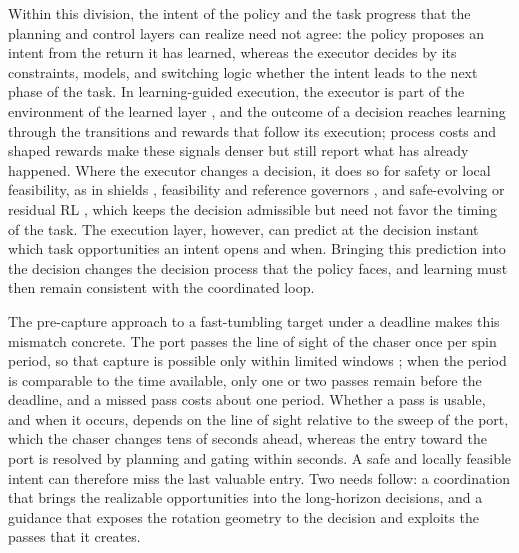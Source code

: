 Within this division, the intent of the policy and the task progress that the planning and control layers can realize need not agree: the policy proposes an intent from the return it has learned, whereas the executor decides by its constraints, models, and switching logic whether the intent leads to the next phase of the task. In learning-guided execution, the executor is part of the environment of the learned layer \cite{reiter2026arc}, and the outcome of a decision reaches learning through the transitions and rewards that follow its execution; process costs and shaped rewards \cite{ng1999shaping} make these signals denser but still report what has already happened. Where the executor changes a decision, it does so for safety or local feasibility, as in shields \cite{alshiekh2018shielding}, feasibility and reference governors \cite{leung2024scl,tartaglione2024aut,duan2025autcon}, and safe-evolving or residual RL \cite{lu2025eaai,zeng2026neucom}, which keeps the decision admissible but need not favor the timing of the task. The execution layer, however, can predict at the decision instant which task opportunities an intent opens and when. Bringing this prediction into the decision changes the decision process that the policy faces, and learning must then remain consistent with the coordinated loop.

The pre-capture approach to a fast-tumbling target under a deadline makes this mismatch concrete. The port passes the line of sight of the chaser once per spin period, so that capture is possible only within limited windows \cite{dong2025aa,wang2026ast}; when the period is comparable to the time available, only one or two passes remain before the deadline, and a missed pass costs about one period. Whether a pass is usable, and when it occurs, depends on the line of sight relative to the sweep of the port, which the chaser changes tens of seconds ahead, whereas the entry toward the port is resolved by planning and gating within seconds. A safe and locally feasible intent can therefore miss the last valuable entry. Two needs follow: a coordination that brings the realizable opportunities into the long-horizon decisions, and a guidance that exposes the rotation geometry to the decision and exploits the passes that it creates.

